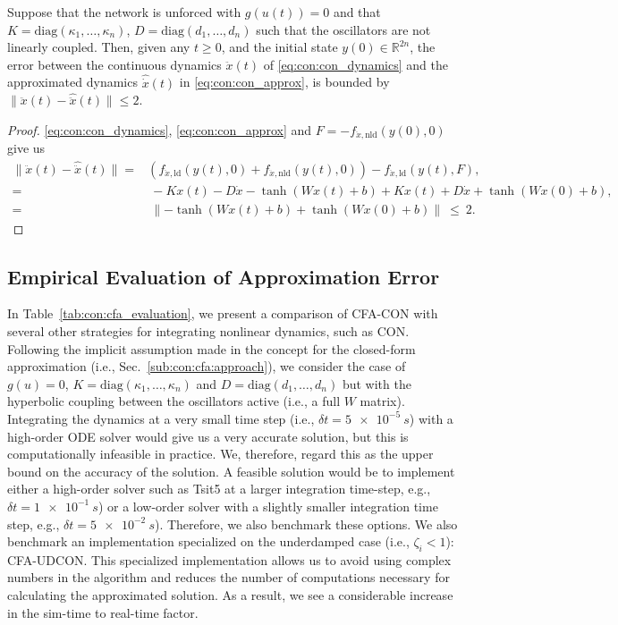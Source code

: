 \begin{lemma}\label{lemma:con:con_cfa_bounds_lemma}
    Suppose that the network is unforced with $g(u(t)) = 0$ and that $K = \mathrm{diag}(\kappa_1, \dots, \kappa_n)$, $D = \mathrm{diag}(d_1, \dots, d_n)$ such that the oscillators are not linearly coupled. Then, given any $t \geq 0$, and the initial state $y(0) \in \mathbb{R}^{2n}$, the error between the continuous dynamics $\ddot{x}(t)$ of \eqref{eq:con:con_dynamics} and the approximated dynamics $\hat{\dot{x}}(t)$ in \eqref{eq:con:con_approx}, is bounded by $\lVert \ddot{x}(t) - \hat{\ddot{x}}(t) \rVert \leq 2$. 
\end{lemma}
\begin{proof}
    \eqref{eq:con:con_dynamics}, \eqref{eq:con:con_approx} and $F =  -f_{\ddot{x}, \mathrm{nld}}(y(0), 0)$ give us
    \begin{equation}
    \begin{split}
        \lVert \ddot{x}(t) - \hat{\ddot{x}}(t) \rVert =& \left (f_{\ddot{x},\mathrm{ld}}(y(t), 0) + f_{\ddot{x},\mathrm{nld}}(y(t), 0) \right ) - f_{\ddot{x},\mathrm{ld}}(y(t), F),\\
        =& \: -K x(t) -D \dot{x} -\tanh(W x(t) + b) + K x(t) + D \dot{x} + \tanh(W x(0) + b),\\
        =& \: \lVert -\tanh(W x(t) + b) + \tanh(W x(0) + b) \rVert
        \: \leq \: 2.
    \end{split}
    \end{equation}
    
\end{proof}

\subsection{Empirical Evaluation of Approximation Error}
In Table~\ref{tab:con:cfa_evaluation}, we present a comparison of \gls{CFA-CON} with several other strategies for integrating nonlinear dynamics, such as \gls{CON}.
Following the implicit assumption made in the concept for the closed-form approximation (i.e., Sec.~\ref{sub:con:cfa:approach}), we consider the case of $g(u) = 0$, $K = \mathrm{diag}(\kappa_1, \dots, \kappa_n)$ and $D = \mathrm{diag}(d_1, \dots, d_n)$ but with the hyperbolic coupling between the oscillators active (i.e., a full $W$ matrix).
Integrating the dynamics at a very small time step (i.e., $\delta t = \num{5e-5}~\si{s}$) with a high-order \gls{ODE} solver would give us a very accurate solution, but this is computationally infeasible in practice. We, therefore, regard this as the upper bound on the accuracy of the solution.
A feasible solution would be to implement either a high-order solver such as Tsit5 at a larger integration time-step, e.g., $\delta t = \num{1e-1}~\si{s}$) or a low-order solver with a slightly smaller integration time step, e.g., $\delta t = \num{5e-2}~\si{s}$). Therefore, we also benchmark these options.
We also benchmark an implementation specialized on the underdamped case (i.e., $\zeta_i <1$): \gls{CFA-UDCON}. This specialized implementation allows us to avoid using complex numbers in the algorithm and reduces the number of computations necessary for calculating the approximated solution.
As a result, we see a considerable increase in the sim-time to real-time factor.

